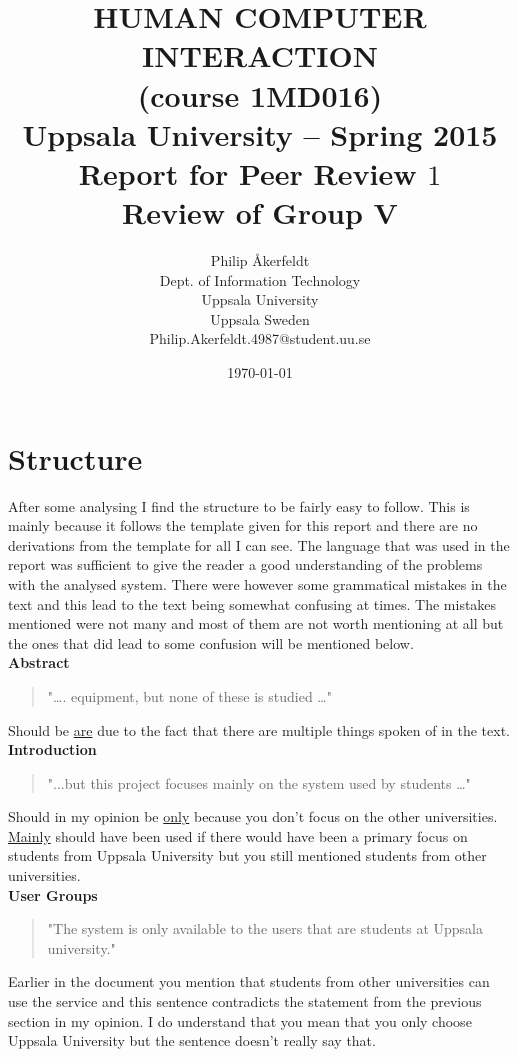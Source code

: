 \documentclass[11pt,a4paper]{article}
\title{\textbf{HUMAN COMPUTER INTERACTION \\(course 1MD016) \\
    Uppsala University -- Spring 2015 \\
    Report for Peer Review $1$ \\
    Review of Group V  %
    }}              %
\author{
Philip Åkerfeldt\\
\textup{Dept. of Information Technology}\\
\textup{Uppsala University}\\
\textup{Uppsala Sweden}\\
\textup{Philip.Akerfeldt.4987@student.uu.se}
}
\date{\today}
\begin{document}
\maketitle
\newpage
\tableofcontents
\pagebreak


\section{Structure}


After some analysing I find the structure to be fairly easy to follow. This is mainly because it follows the template given for this report and there are no derivations from the template for all I can see. 
The language that was used in the report was sufficient to give the reader a good understanding of the problems with the analysed system. There were however some grammatical mistakes in the text and this lead to the text being somewhat confusing at times. The mistakes mentioned were not many and most of them are not worth mentioning at all but the ones that did lead to some confusion will be mentioned below. \\

\textbf{Abstract}
\begin{quote}
"…. equipment, but none of these is studied …" 
\end{quote}
 Should be \underline{are} due to the fact that there are multiple things spoken of in the text.\\

\textbf{Introduction}
\begin{quote}
"...but this project focuses mainly on the system used by students …"
\end{quote}
Should in my opinion be \underline{only} because you don’t focus on the other universities. \underline{Mainly} should have been used if there would have been a primary focus on students from Uppsala University but you still mentioned students from other universities.\\

\textbf{User Groups}
\begin{quote}
"The system is only available to the users that are students at Uppsala university."
\end{quote}
Earlier in the document you mention that students from other universities can use the service and this sentence contradicts the statement from the previous section in my opinion. I do understand that you mean that you only choose Uppsala University but the sentence doesn't really say that. \\
\end{document}
